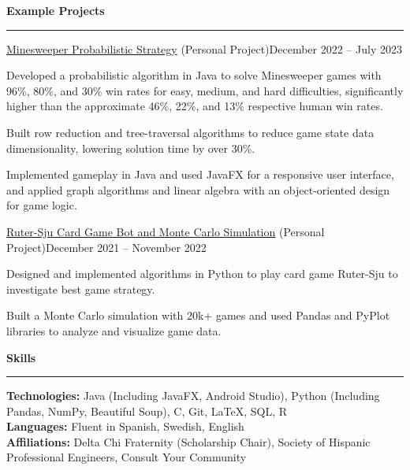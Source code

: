 \documentclass{article}
\newcommand{\horizontal}{\vspace{2pt}\hrule}
\newcommand{\sectitle}[1]{\vspace{2pt} \textbf{\large #1} \horizontal}
\newcommand{\skill}[2]{\textbf{#1:} #2}
\begin{document}
\begin{flushleft}
\sectitle{Example Projects}

    \vspace{3pt}

    \begin{subexperience}{\href{https://github.com/dsoman24/minesweeper}{Minesweeper Probabilistic Strategy} (Personal Project)}{December 2022 -- July 2023}
        \item Developed a probabilistic algorithm in Java to solve Minesweeper games with 96\%, 80\%, and 30\% win rates for easy, medium, and hard difficulties, significantly higher than the approximate 46\%, 22\%, and 13\% respective human win rates.
        \item Built row reduction and tree-traversal algorithms to reduce game state data dimensionality, lowering solution time by over 30\%.
        \item Implemented gameplay in Java and used JavaFX for a responsive user interface, and applied graph algorithms and linear algebra with an object-oriented design for game logic.
    \end{subexperience}

    \begin{subexperience}{\href{https://github.com/dsoman24/ruter-sju}{Ruter-Sju Card Game Bot and Monte Carlo Simulation} (Personal Project)}{December 2021 -- November 2022}
        \item Designed and implemented algorithms in Python to play card game Ruter-Sju to investigate best game strategy.
        \item Built a Monte Carlo simulation with 20k+ games and used Pandas and PyPlot libraries to analyze and visualize game data.
    \end{subexperience}

\sectitle{Skills}

    \vspace{3pt}
    \skill{Technologies}{Java (Including JavaFX, Android Studio), Python (Including Pandas, NumPy, Beautiful Soup), C, Git, LaTeX, SQL, R} \\
    \skill{Languages}{Fluent in Spanish, Swedish, English} \\
    \skill{Affiliations}{Delta Chi Fraternity (Scholarship Chair), Society of Hispanic Professional Engineers, Consult Your Community}

\end{flushleft}
\end{document}
